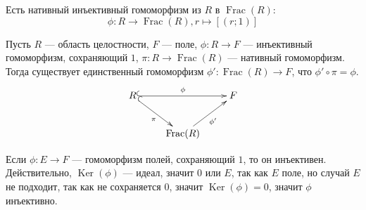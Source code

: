 \documentclass[12pt,a4paper]{article}
\DeclareMathOperator{\Ker}{Ker}
\DeclareMathOperator{\Frac}{Frac}
\begin{document}
    \begin{remark}
        Есть нативный инъективный гомоморфизм из $R$ в $\Frac(R)$:
        \[\phi: R \to \Frac(R), r \mapsto [(r; 1)]\]
    \end{remark}

    \begin{theorem}
        Пусть $R$ --- область целостности, $F$ --- поле, $\phi: R \to F$ --- инъективный гомоморфизм, сохраняющий $1$, $\pi: R \to \Frac(R)$ --- нативный гомоморфизм. Тогда существует единственный гомоморфизм $\phi': \Frac(R) \to F$, что $\phi' \circ \pi = \phi$.
        \[
            \xymatrix{
                R \ar@{^{(}->}[rd]_{\pi} \ar@{^{(}->}[rr]^\phi && F\\
                & \Frac(R) \ar[ur]_{\phi'}
            }
        \]
    \end{theorem}

    \begin{remark}
        Если $\phi: E \to F$ --- гомоморфизм полей, сохраняющий $1$, то он инъективен. Действительно, $\Ker(\phi)$ --- идеал, значит ${0}$ или $E$, так как $E$ поле, но случай $E$ не подходит, так как не сохраняется $0$, значит $\Ker(\phi) = {0}$, значит $\phi$ инъективно.
    \end{remark}
\end{document}
